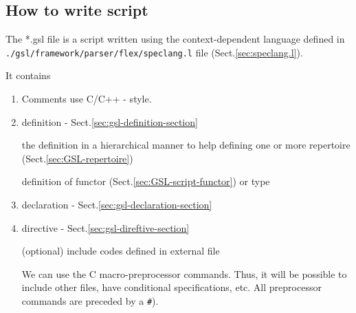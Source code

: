 \subsection{How to write script}
\label{sec:GSL-script-structure}


The *.gsl file is a script written using the context-dependent language defined
in \verb!./gsl/framework/parser/flex/speclang.l! file (Sect.\ref{sec:speclang.l}).

It contains
\begin{enumerate}
  \item Comments use C/C++ - style. 
  
  \item definition - Sect.\ref{sec:gsl-definition-section}

  the definition in a hierarchical manner to help defining 
  one or more repertoire (Sect.\ref{sec:GSL-repertoire})
  
  definition of functor (Sect.\ref{sec:GSL-script-functor}) or type
  
  \item declaration - Sect.\ref{sec:gsl-declaration-section}
  
  \item directive - Sect.\ref{sec:gsl-direftive-section}
  
  (optional) include codes defined in external file
  
We can use the C macro-preprocessor commands. Thus, it will be possible to
include other files, have conditional specifications, etc. All preprocessor
commands are preceded by a \verb!#!). 
  
\end{enumerate}



